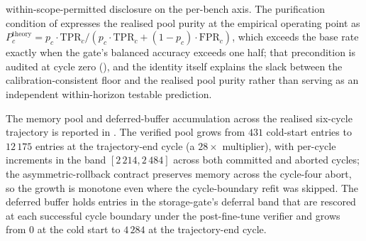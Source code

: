 within-scope-permitted disclosure on the per-bench axis. The purification condition of  expresses the realised pool purity at the empirical operating point as $P_c^{\text{theory}} = p_c \cdot \mathrm{TPR}_c / (p_c \cdot \mathrm{TPR}_c + (1-p_c) \cdot \mathrm{FPR}_c)$, which exceeds the base rate exactly when the gate's balanced accuracy exceeds one half; that precondition is audited at cycle zero (), and the identity itself explains the slack between the calibration-consistent floor and the realised pool purity rather than serving as an independent within-horizon testable prediction.



The memory pool and deferred-buffer accumulation across the realised six-cycle trajectory is reported in . The verified pool grows from $431$ cold-start entries to $12\,175$ entries at the trajectory-end cycle (a $28\times$ multiplier), with per-cycle increments in the band $[2\,214, 2\,484]$ across both committed and aborted cycles; the asymmetric-rollback contract preserves memory across the cycle-four abort, so the growth is monotone even where the cycle-boundary refit was skipped. The deferred buffer holds entries in the storage-gate's deferral band that are rescored at each successful cycle boundary under the post-fine-tune verifier and grows from $0$ at the cold start to $4\,284$ at the trajectory-end cycle.




